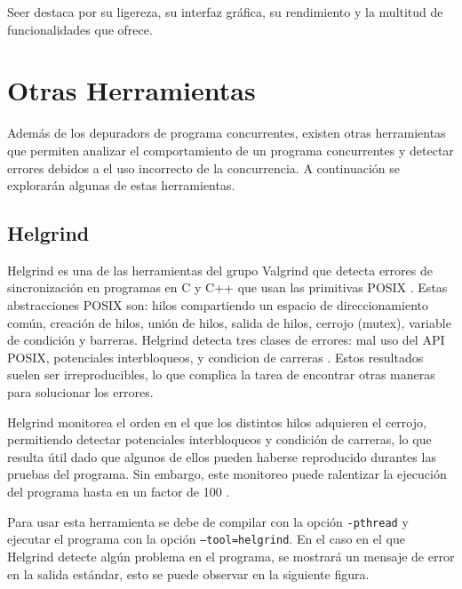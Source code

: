 Seer destaca por su ligereza, su \gls{interfaz gráfica}, su rendimiento y la multitud de funcionalidades que ofrece.


\section{Otras Herramientas}\label{sec:herramientas}

Además de los \glspl{depurador} de \glspl{programa concurrente}, existen otras herramientas que permiten analizar el comportamiento de un \glspl{programa concurrente} y detectar errores debidos a el uso incorrecto de la \gls{concurrencia}. A continuación se explorarán algunas de estas herramientas.

\subsection{Helgrind}{\label{subsec:helgrind}}

Helgrind es una de las herramientas del grupo Valgrind que detecta errores de sincronización en programas en C y C++ que usan las primitivas POSIX \cite{POSIX}. Estas abstracciones POSIX son: \glspl{hilo} compartiendo un espacio de direccionamiento común, creación de \glspl{hilo}, unión de \glspl{hilo}, salida de \glspl{hilo}, \gls{cerrojo} (mutex), \gls{variable de condición} y \glspl{barrera}. Helgrind detecta tres clases de errores: mal uso del API POSIX, potenciales \glspl{interbloqueo}, y \glspl{condicion de carrera} \cite{Helgrind}. 
Estos resultados suelen ser irreproducibles, lo que complica la tarea de encontrar otras maneras para solucionar los errores.

Helgrind monitorea el orden en el que los distintos \glspl{hilo} adquieren el \gls{cerrojo}, permitiendo detectar potenciales \glspl{interbloqueo} y \glspl{condición de carrera}, lo que resulta útil dado que algunos de ellos pueden haberse reproducido durantes las pruebas del programa. Sin embargo, este monitoreo puede ralentizar la ejecución del programa hasta en un factor de 100 \cite{Helgrind}.

Para usar esta herramienta se debe de compilar con la opción \texttt{-pthread} y ejecutar el programa con la opción \texttt{--tool=helgrind}. En el caso en el que Helgrind detecte algún problema en el programa, se mostrará un mensaje de error en la \gls{salida estándar}, esto se puede observar en la siguiente figura.

